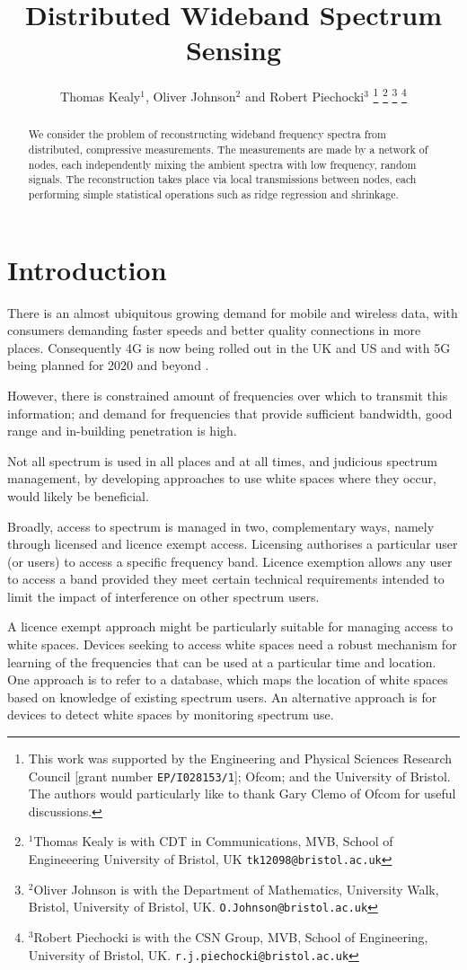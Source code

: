 \documentclass[conference]{IEEEtran}
\title{Distributed Wideband Spectrum Sensing}
\author{Thomas Kealy$^{1}$, Oliver Johnson$^{2}$ and Robert Piechocki$^{3}$%
\thanks{This work was supported by the Engineering and Physical Sciences Research Council [grant number {\tt EP/I028153/1}]; Ofcom; and the University of Bristol. The authors would particularly like to thank Gary Clemo of Ofcom for useful discussions.}%
\thanks{ $^{1}$Thomas Kealy is with CDT in Communications, MVB, School of Engineeering University of Bristol, UK
        {\tt\small tk12098@bristol.ac.uk}}%
\thanks{$^{2}$Oliver Johnson is with the Department of Mathematics, University Walk, Bristol, University of Bristol, UK.
        {\tt\small O.Johnson@bristol.ac.uk}}%
\thanks{$^{3}$Robert Piechocki is with the CSN Group, MVB, School of Engineering, University of Bristol, UK.
        {\tt\small r.j.piechocki@bristol.ac.uk}}%
}
\begin{document}
\maketitle

\begin{abstract}
\noindent We consider the problem of reconstructing wideband frequency spectra from distributed, compressive measurements. The measurements are made by a network of nodes, each independently mixing the ambient spectra with low frequency, random signals. The reconstruction takes place via local transmissions between nodes, each performing simple statistical operations such as ridge regression and shrinkage.
\end{abstract}

\section{Introduction}

There is an almost ubiquitous growing demand for mobile and wireless data, with consumers demanding faster speeds and better quality connections in more places. Consequently 4G is now being rolled out in the UK and US and with 5G being planned for 2020 and beyond \cite{Dahlman2014}.  

However, there is constrained amount of frequencies over which to transmit this information; and demand for frequencies that provide sufficient bandwidth, good range and in-building penetration is high.

Not all spectrum is used in all places and at all times, and judicious spectrum management, by developing approaches to use white spaces where they occur, would likely be beneficial.

Broadly, access to spectrum is managed in two, complementary ways, namely through licensed and licence exempt access. Licensing authorises a particular user (or users) to access a specific frequency band. Licence exemption allows any user to access a band provided they meet certain technical requirements intended to limit the impact of interference on other spectrum users.

A licence exempt approach might be particularly suitable for managing access to white spaces. Devices seeking to access white spaces need a robust mechanism for learning of the frequencies that can be used at a particular time and location. One approach is to refer to a database, which maps the location of white spaces based on knowledge of existing spectrum users. An alternative approach is for devices to detect white spaces by monitoring spectrum use. 
\end{document}

